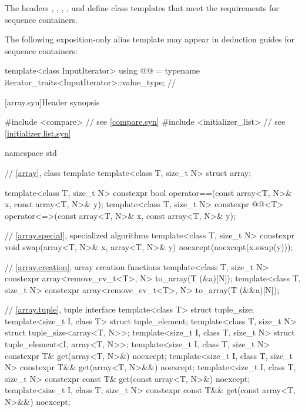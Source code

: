 \pnum
The headers
,
,
,
, and
define class templates that meet the requirements for sequence containers.

\pnum
The following exposition-only alias template may appear in deduction guides for sequence containers:

\begin{codeblock}
template<class InputIterator>
  using @@ = typename iterator_traits<InputIterator>::value_type;  // \expos
\end{codeblock}

[array.syn]{Header  synopsis}

%
\begin{codeblock}
#include <compare>              // see \ref{compare.syn}
#include <initializer_list>     // see \ref{initializer.list.syn}

namespace std {
  // \ref{array}, class template 
  template<class T, size_t N> struct array;

  template<class T, size_t N>
    constexpr bool operator==(const array<T, N>& x, const array<T, N>& y);
  template<class T, size_t N>
    constexpr @@<T>
      operator<=>(const array<T, N>& x, const array<T, N>& y);

  // \ref{array.special}, specialized algorithms
  template<class T, size_t N>
    constexpr void swap(array<T, N>& x, array<T, N>& y) noexcept(noexcept(x.swap(y)));

  // \ref{array.creation}, array creation functions
  template<class T, size_t N>
    constexpr array<remove_cv_t<T>, N> to_array(T (&a)[N]);
  template<class T, size_t N>
    constexpr array<remove_cv_t<T>, N> to_array(T (&&a)[N]);

  // \ref{array.tuple}, tuple interface
  template<class T> struct tuple_size;
  template<size_t I, class T> struct tuple_element;
  template<class T, size_t N>
    struct tuple_size<array<T, N>>;
  template<size_t I, class T, size_t N>
    struct tuple_element<I, array<T, N>>;
  template<size_t I, class T, size_t N>
    constexpr T& get(array<T, N>&) noexcept;
  template<size_t I, class T, size_t N>
    constexpr T&& get(array<T, N>&&) noexcept;
  template<size_t I, class T, size_t N>
    constexpr const T& get(const array<T, N>&) noexcept;
  template<size_t I, class T, size_t N>
    constexpr const T&& get(const array<T, N>&&) noexcept;
}
\end{codeblock}

